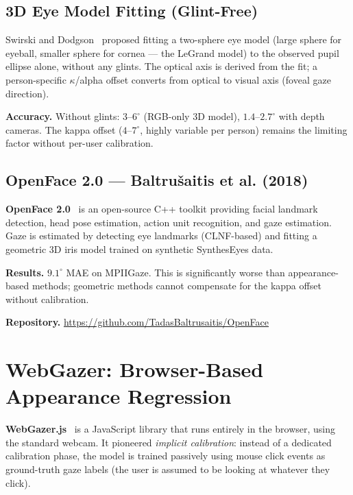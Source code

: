 \documentclass[11pt,a4paper]{article}
\begin{document}
\subsection{3D Eye Model Fitting (Glint-Free)}

Swirski and Dodgson~\cite{swirski2013fully} proposed fitting a two-sphere eye model (large sphere for eyeball, smaller sphere for cornea --- the LeGrand model) to the observed pupil ellipse alone, without any glints.
The optical axis is derived from the fit; a person-specific $\kappa$/alpha offset converts from optical to visual axis (foveal gaze direction).

\textbf{Accuracy.} Without glints: $3$--$6^\circ$ (RGB-only 3D model), $1.4$--$2.7^\circ$ with depth cameras.
The kappa offset ($4$--$7^\circ$, highly variable per person) remains the limiting factor without per-user calibration.

\subsection{OpenFace 2.0 --- Baltrušaitis et al. (2018)}

\textbf{OpenFace 2.0}~\cite{baltrusaitis2018openface} is an open-source C++ toolkit providing facial landmark detection, head pose estimation, action unit recognition, and gaze estimation.
Gaze is estimated by detecting eye landmarks (CLNF-based) and fitting a geometric 3D iris model trained on synthetic SynthesEyes data.

\textbf{Results.} $9.1^\circ$ MAE on MPIIGaze. This is significantly worse than appearance-based methods; geometric methods cannot compensate for the kappa offset without calibration.

\textbf{Repository.} \url{https://github.com/TadasBaltrusaitis/OpenFace}

\section{WebGazer: Browser-Based Appearance Regression}
\label{sec:webgazer}

\textbf{WebGazer.js}~\cite{papoutsaki2016webgazer} is a JavaScript library that runs entirely in the browser, using the standard webcam.
It pioneered \textit{implicit calibration}: instead of a dedicated calibration phase, the model is trained passively using mouse click events as ground-truth gaze labels (the user is assumed to be looking at whatever they click).
\end{document}
